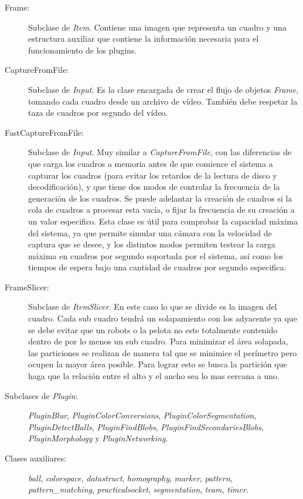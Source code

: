 \begin{description}

	\item[Frame:] Subclase de \emph{Item}. Contiene una imagen que
		representa un cuadro y una estructura auxiliar que contiene la
		información necesaria para el funcionamiento de los plugins.

	\item[CaptureFromFile:] Subclase de \emph{Input}. Es la clase encargada
		de crear el flujo de objetos \emph{Frame}, tomando cada cuadro
		desde un archivo de vídeo. También debe respetar la taza de
		cuadros por segundo del vídeo.

	\item[FastCaptureFromFile:] Subclase de \emph{Input}. Muy similar a
		\emph{CaptureFromFile}, con las diferencias de que carga los
		cuadros a memoria antes de que comience el sistema a capturar
		los cuadros (para evitar los retardos de la lectura de disco y
		decodificación), y que tiene dos modos de controlar la
		frecuencia de la generación de los cuadros. Se puede adelantar
		la creación de cuadros si la cola de cuadros a procesar esta
		vacía, o fijar la frecuencia de su creación a un valor
		especifico. Esta clase es útil para comprobar la capacidad
		máxima del sistema, ya que permite simular una cámara con la
		velocidad de captura que se desee, y los distintos modos
		permiten testear la carga máxima en cuadros por segundo
		soportada por el sistema, así como los tiempos de espera bajo
		una cantidad de cuadros por segundo especifica.

	\item[FrameSlicer:] Subclase de \emph{ItemSlicer}. En este caso lo que
		se divide es la imagen del cuadro. Cada sub cuadro tendrá un
		solapamiento con los adyacente ya que se debe evitar que un
		robots o la pelota no este totalmente contenido dentro de por lo
		menos un sub cuadro. Para minimizar el área solapada, las
		particiones se realizan de manera tal que se minimice el
		perímetro pero ocupen la mayor área posible. Para lograr esto se
		busca la partición que haga que la relación entre el alto y el
		ancho sea lo mas cercana a uno.

	\item[Subclases de \emph{Plugin}:] \emph{PluginBlur},
		\emph{PluginColorConversions}, \emph{PluginColorSegmentation},
		\emph{PluginDetectBalls}, \emph{PluginFindBlobs},
		\emph{PluginFindSecondariesBlobs}, \emph{PluginMorphology} y
		\emph{PluginNetworking}.

	\item[Clases auxiliares:] \emph{ball}, \emph{colorspace},
		\emph{datastruct}, \emph{homography}, \emph{marker},
		\emph{pattern}, \emph{pattern\_matching},
		\emph{practicalsocket}, \emph{segmentation}, \emph{team},
		\emph{timer}.

\end{description}

